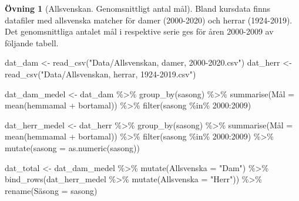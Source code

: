 \documentclass[
]{book}
\newenvironment{Shaded}{\begin{snugshade}}{\end{snugshade}}
\newcommand{\AttributeTok}[1]{\textcolor[rgb]{0.77,0.63,0.00}{#1}}
\newcommand{\DecValTok}[1]{\textcolor[rgb]{0.00,0.00,0.81}{#1}}
\newcommand{\FunctionTok}[1]{\textcolor[rgb]{0.00,0.00,0.00}{#1}}
\newcommand{\NormalTok}[1]{#1}
\newcommand{\OtherTok}[1]{\textcolor[rgb]{0.56,0.35,0.01}{#1}}
\newcommand{\SpecialCharTok}[1]{\textcolor[rgb]{0.00,0.00,0.00}{#1}}
\newcommand{\StringTok}[1]{\textcolor[rgb]{0.31,0.60,0.02}{#1}}
\theoremstyle{definition}
\theoremstyle{definition}
\theoremstyle{definition}
\newtheorem{exercise}{Övning}[chapter]
\theoremstyle{definition}
\theoremstyle{remark}
\begin{document}
\begin{exercise}[Allsvenskan. Genomsnittligt antal mål]
Bland kursdata finns datafiler med allsvenska matcher för damer (2000-2020) och herrar (1924-2019).
Det genomsnittliga antalet mål i respektive serie ges för åren 2000-2009 av följande tabell.

\begin{Shaded}
\begin{Highlighting}[]
\NormalTok{dat\_dam }\OtherTok{\textless{}{-}} \FunctionTok{read\_csv}\NormalTok{(}\StringTok{"Data/Allsvenskan, damer, 2000{-}2020.csv"}\NormalTok{)}
\NormalTok{dat\_herr }\OtherTok{\textless{}{-}} \FunctionTok{read\_csv}\NormalTok{(}\StringTok{"Data/Allsvenskan, herrar, 1924{-}2019.csv"}\NormalTok{)}

\NormalTok{dat\_dam\_medel }\OtherTok{\textless{}{-}}\NormalTok{ dat\_dam }\SpecialCharTok{\%\textgreater{}\%} 
  \FunctionTok{group\_by}\NormalTok{(sasong) }\SpecialCharTok{\%\textgreater{}\%} 
  \FunctionTok{summarise}\NormalTok{(Mål }\OtherTok{=} \FunctionTok{mean}\NormalTok{(hemmamal }\SpecialCharTok{+}\NormalTok{ bortamal)) }\SpecialCharTok{\%\textgreater{}\%} 
  \FunctionTok{filter}\NormalTok{(sasong }\SpecialCharTok{\%in\%} \DecValTok{2000}\SpecialCharTok{:}\DecValTok{2009}\NormalTok{)}

\NormalTok{dat\_herr\_medel }\OtherTok{\textless{}{-}}\NormalTok{ dat\_herr }\SpecialCharTok{\%\textgreater{}\%} 
  \FunctionTok{group\_by}\NormalTok{(sasong) }\SpecialCharTok{\%\textgreater{}\%} 
  \FunctionTok{summarise}\NormalTok{(Mål }\OtherTok{=} \FunctionTok{mean}\NormalTok{(hemmamal }\SpecialCharTok{+}\NormalTok{ bortamal)) }\SpecialCharTok{\%\textgreater{}\%} 
  \FunctionTok{filter}\NormalTok{(sasong }\SpecialCharTok{\%in\%} \DecValTok{2000}\SpecialCharTok{:}\DecValTok{2009}\NormalTok{) }\SpecialCharTok{\%\textgreater{}\%} 
  \FunctionTok{mutate}\NormalTok{(}\AttributeTok{sasong =} \FunctionTok{as.numeric}\NormalTok{(sasong))}

\NormalTok{dat\_total }\OtherTok{\textless{}{-}}\NormalTok{ dat\_dam\_medel }\SpecialCharTok{\%\textgreater{}\%}
  \FunctionTok{mutate}\NormalTok{(}\AttributeTok{Allsvenska =} \StringTok{"Dam"}\NormalTok{) }\SpecialCharTok{\%\textgreater{}\%} 
  \FunctionTok{bind\_rows}\NormalTok{(dat\_herr\_medel }\SpecialCharTok{\%\textgreater{}\%} \FunctionTok{mutate}\NormalTok{(}\AttributeTok{Allsvenska =} \StringTok{"Herr"}\NormalTok{)) }\SpecialCharTok{\%\textgreater{}\%} 
  \FunctionTok{rename}\NormalTok{(Säsong }\OtherTok{=}\NormalTok{ sasong)}


\end{Highlighting}
\end{Shaded}
\end{exercise}
\end{document}
